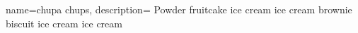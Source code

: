 

{
  name={chupa chups},
  description= {Powder fruitcake ice cream ice cream brownie biscuit ice cream ice cream}
}

